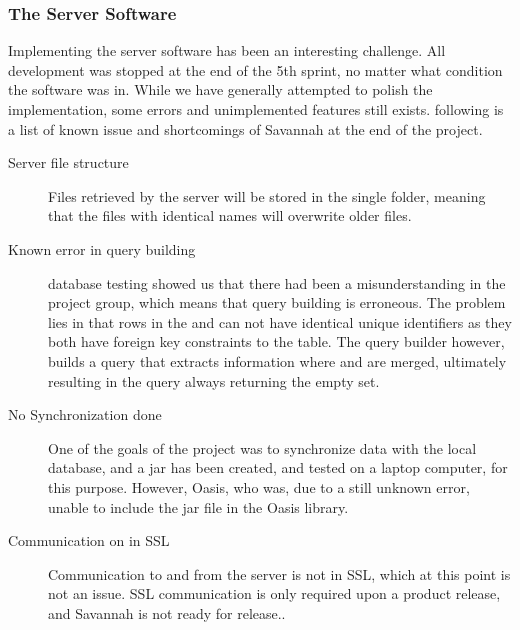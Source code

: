 \subsubsection*{The Server Software}
Implementing the server software has been an interesting challenge. All development was stopped at the end of the 5th sprint, no matter what condition the software was in. While we have generally attempted to polish the implementation, some errors and unimplemented features still exists. following is a list of known issue and shortcomings of Savannah at the end of the project.
\begin{description}
 \item[Server file structure] Files retrieved by the server will be stored in the single folder, meaning that the files with identical names will overwrite older files.

 \item[Known error in query building] database testing showed us that there had been a misunderstanding in the project group, which means that query building is erroneous. The problem lies in that rows in the  and  can not have identical unique identifiers as they both have foreign key constraints to the  table. The query builder however, builds a query that extracts information where  and  are merged, ultimately resulting in the query always returning the empty set.

 \item[No Synchronization done] One of the goals of the project was to synchronize data with the local database, and a jar has been created, and tested on a laptop computer, for this purpose. However, Oasis, who was, due to a still unknown error, unable to include the jar file in the Oasis library.

 \item[Communication on in SSL] Communication to and from the server is not in SSL, which at this point is not an issue. SSL communication is only required upon a product release, and Savannah is not ready for release..
 
\end{description}


